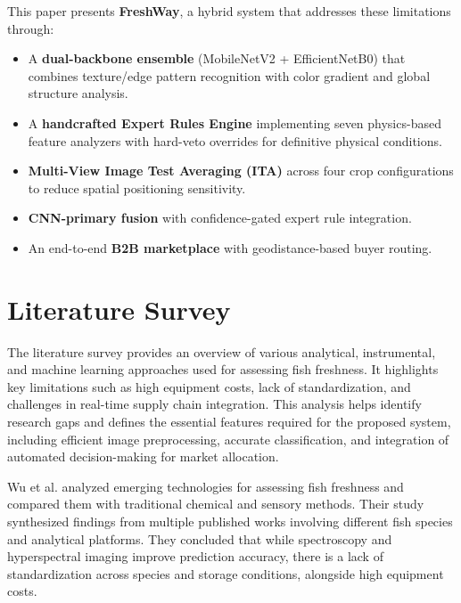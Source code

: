 \documentclass[conference]{IEEEtran}
\begin{document}
This paper presents \textbf{FreshWay}, a hybrid system that addresses these limitations through:
\begin{itemize}[leftmargin=*]
    \item A \textbf{dual-backbone ensemble} (MobileNetV2 + EfficientNetB0) that combines texture/edge pattern recognition with color gradient and global structure analysis.
    \item A \textbf{handcrafted Expert Rules Engine} implementing seven physics-based feature analyzers with hard-veto overrides for definitive physical conditions.
    \item \textbf{Multi-View Image Test Averaging (ITA)} across four crop configurations to reduce spatial positioning sensitivity.
    \item \textbf{CNN-primary fusion} with confidence-gated expert rule integration.
    \item An end-to-end \textbf{B2B marketplace} with geodistance-based buyer routing.
\end{itemize}

\section{Literature Survey}

The literature survey provides an overview of various analytical, instrumental, and machine learning approaches used for assessing fish freshness. It highlights key limitations such as high equipment costs, lack of standardization, and challenges in real-time supply chain integration. This analysis helps identify research gaps and defines the essential features required for the proposed system, including efficient image preprocessing, accurate classification, and integration of automated decision-making for market allocation.

Wu et al. \cite{ref1} analyzed emerging technologies for assessing fish freshness and compared them with traditional chemical and sensory methods. Their study synthesized findings from multiple published works involving different fish species and analytical platforms. They concluded that while spectroscopy and hyperspectral imaging improve prediction accuracy, there is a lack of standardization across species and storage conditions, alongside high equipment costs.
\end{document}
